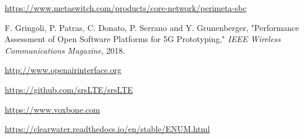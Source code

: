 \begin{thebibliography}{99}
\begin{LTRitems}
\url{https://www.metaswitch.com/products/core-network/perimeta-sbc}

F. Gringoli, P. Patras, C. Donato, P. Serrano and Y. Grunenberger, "Performance Assessment of Open Software Platforms for 5G Prototyping," {\em IEEE Wireless Communications Magazine}, 2018.

\url{http://www.openairinterface.org}

\url{https://github.com/srsLTE/srsLTE}

\url{https://www.voxbone.com}

\url{https://clearwater.readthedocs.io/en/stable/ENUM.html}





\end{LTRitems}

\end{thebibliography}
